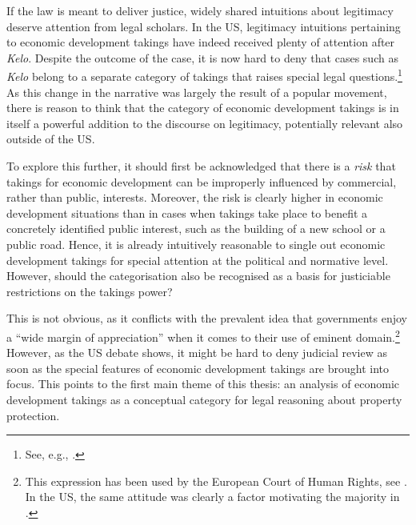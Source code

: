 
If the law is meant to deliver justice, widely shared intuitions about legitimacy deserve attention from legal scholars. In the US, legitimacy intuitions pertaining to economic development takings have indeed received plenty of attention after {\it Kelo}. Despite the outcome of the case, it is now hard to deny that cases such as {\it Kelo} belong to a separate category of takings that raises special legal questions.\footnote{See, e.g., \cite{cohen06,somin07}.} As this change in the narrative was largely the result of a popular movement, there is reason to think that the category of economic development takings is in itself a powerful addition to the discourse on legitimacy, potentially relevant also outside of the US.

To explore this further, it should first be acknowledged that there is a {\it risk} that takings for economic development can be improperly influenced by commercial, rather than public, interests. Moreover, the risk is clearly higher in economic development situations than in cases when takings take place to benefit a concretely identified public interest, such as the building of a new school or a public road. Hence, it is already intuitively reasonable to single out economic development takings for special attention at the political and normative level. However, should the categorisation also be recognised as a basis for justiciable restrictions on the takings power?

This is not obvious, as it conflicts with the prevalent idea that governments enjoy a ``wide margin of appreciation'' when it comes to their use of eminent domain.\footnote{This expression has been used by the European Court of Human Rights, see \cite[54]{james86}. In the US, the same attitude was clearly a factor motivating the majority in \cite{kelo05}.} However, as the US debate shows, it might be hard to deny judicial review as soon as the special features of economic development takings are brought into focus. This points to the first main theme of this thesis: an analysis of economic development takings as a conceptual category for legal reasoning about property protection.

